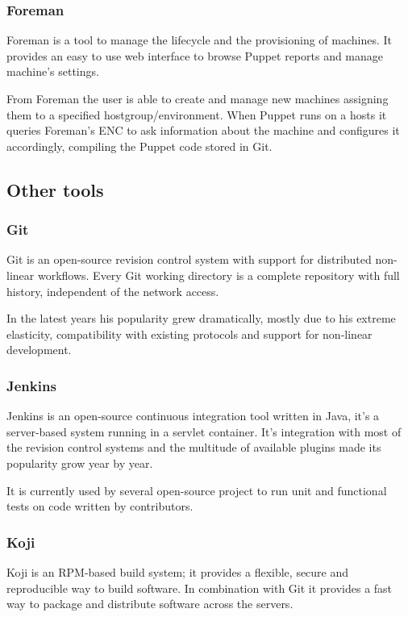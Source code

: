 \subsubsection{Foreman}

Foreman \cite{ForemanWebsite} is a tool to manage the lifecycle and the
provisioning of machines. It provides an easy to use web interface to
browse Puppet reports and manage machine's settings.

From Foreman the user is able to create and manage new machines assigning
them to a specified hostgroup/environment. When Puppet runs on a hosts it
queries Foreman's ENC to ask information about the machine and configures
it accordingly, compiling the Puppet code stored in Git.

\subsection{Other tools}

\subsubsection{Git}

Git is an open-source revision control system with support for distributed
non-linear workflows. Every Git working directory is a complete repository
with full history, independent of the network access.

In the latest years his popularity grew dramatically, mostly due to his
extreme elasticity, compatibility with existing protocols and support for
non-linear development.

\subsubsection{Jenkins}

Jenkins is an open-source continuous integration tool written in Java,
it's a server-based system running in a servlet container. It's
integration with most of the revision control systems and the multitude of
available plugins made its popularity grow year by year.

It is currently used by several open-source project to run unit and
functional tests on code written by contributors.

\subsubsection{Koji}

Koji is an RPM-based build system; it provides a flexible, secure and
reproducible way to build software. In combination with Git it provides
a fast way to package and distribute software across the servers.

